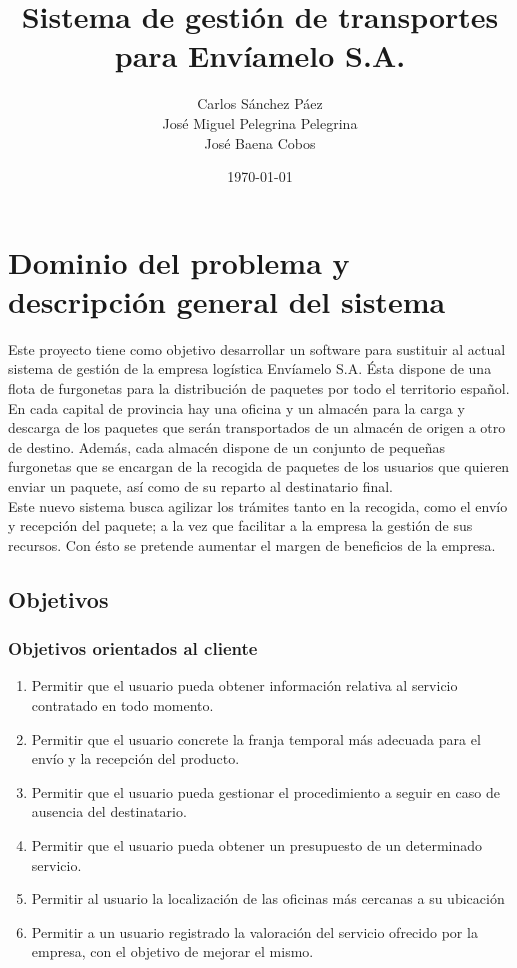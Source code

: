 \documentclass[12pt,spanish]{article}
\title{Sistema de gestión de transportes \\  \small{para Envíamelo S.A.}}
\date{\today}
\author{Carlos Sánchez Páez \\ José Miguel Pelegrina Pelegrina \\ José Baena Cobos}
\begin{document}
	
\maketitle
\thispagestyle{empty}
\newpage
\tableofcontents
\listoftables
\thispagestyle{empty}
\newpage
\setcounter{page}{1}

\section{Dominio del problema y descripción general del sistema}
Este proyecto tiene como objetivo desarrollar un software para sustituir al actual sistema de gestión de la empresa logística Envíamelo S.A. Ésta dispone de una flota de furgonetas para la distribución de paquetes por todo el territorio español. En cada capital de provincia hay una oficina y un almacén para la carga y descarga de los paquetes que serán transportados de un almacén de origen a otro de destino. Además, cada almacén dispone de un conjunto de pequeñas furgonetas que se encargan de la recogida de paquetes de los usuarios que quieren enviar un paquete, así como de su reparto al destinatario final. \\
Este nuevo sistema busca agilizar los trámites tanto en la recogida, como el envío y recepción del paquete; a la vez que facilitar a la empresa la gestión de sus recursos. Con ésto se pretende aumentar el margen de beneficios de la empresa.

\subsection{Objetivos}

\subsubsection{Objetivos orientados al cliente}

\begin{enumerate}[label=\textbf{OBJ-\arabic*}]
	\item Permitir que el usuario pueda obtener información relativa al servicio contratado en todo momento.
	\item Permitir que el usuario concrete la franja temporal más adecuada para el envío y la recepción del producto.
	\item Permitir que el usuario pueda gestionar el procedimiento a seguir en caso de ausencia del destinatario.
	\item Permitir que el usuario pueda obtener un presupuesto de un determinado servicio.
	\item Permitir al usuario la localización de las oficinas más cercanas a su ubicación
	\item Permitir a un usuario registrado la valoración del servicio ofrecido por la empresa, con el objetivo de mejorar el mismo.
\end{enumerate}
\end{document}
